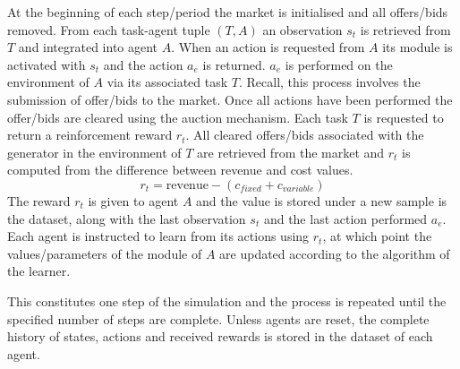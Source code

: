 At the beginning of each step/period the market is initialised and all
offers/bids removed.  From each task-agent tuple $(T,A)$ an observation $s_t$
is retrieved from $T$ and integrated into agent $A$.  When an action is
requested from $A$ its module is activated with $s_t$ and the action $a_e$ is
returned.  $a_e$ is performed on the environment of $A$ via its associated task
$T$.  Recall, this process involves the submission of offer/bids to the market.
Once all actions have been performed the offer/bids are cleared using the
auction mechanism.  Each task $T$ is requested to return a reinforcement reward
$r_t$. All cleared offers/bids associated with the generator in the environment
of $T$ are retrieved from the market and $r_t$ is computed from the difference
between revenue and cost values.
\begin{equation}
r_t = \mbox{revenue} - (c_{fixed} + c_{variable})
\end{equation}
The reward $r_t$ is given to agent $A$ and the value is stored under a new
sample is the dataset, along with the last observation $s_t$ and the last action
performed $a_e$.  Each agent is instructed to learn from its actions using
$r_t$, at which point the values/parameters of the module of $A$ are updated
according to the algorithm of the learner.

This constitutes one step of the simulation and the process is repeated until
the specified number of steps are complete.  Unless agents are reset, the
complete history of states, actions and received rewards is stored in the
dataset of each agent.
